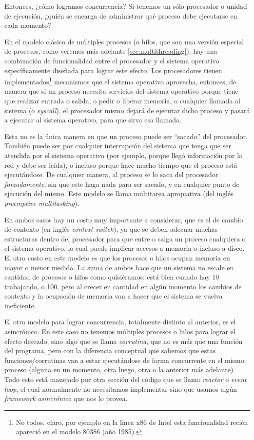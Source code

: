Entonces, ¿cómo logramos concurrencia? Si tenemos un sólo procesador o unidad de ejecución, ¿quién se encarga de administrar qué proceso debe ejecutarse en cada momento? 

En el modelo clásico de múltiples procesos (o hilos, que son una versión especial de procesos, como veremos más adelante \ref{sec:multithreading}), hay una combinación de funcionalidad entre el procesador y el sistema operativo específicamente diseñada para lograr este efecto. Los procesadores tienen implementados\footnote{No todos, claro, por ejemplo en la linea x86 de Intel esta funcionalidad recién apareció en el modelo 80386 (año 1985).} mecanismos que el sistema operativo aprovecha, entonces, de manera que si un proceso necesita servicios del sistema operativo porque tiene que realizar entrada o salida, o pedir o liberar memoria, o cualquier llamada al sistema (o \textit{syscall}), el procesador mismo dejará de ejecutar dicho proceso y pasará a ejecutar al sistema operativo, para que sirva esa llamada.

Esta no es la única manera en que un proceso puede ser ``sacado'' del procesador. También puede ser por cualquier interrupción del sistema que tenga que ser atendida por el sistema operativo (por ejemplo, porque llegó información por la red y debe ser leída), o incluso porque hace mucho tiempo que el proceso está ejecutándose. De cualquier manera, al proceso se lo saca del procesador \textit{forzadamente}, sin que este haga nada para ser sacado, y en cualquier punto de ejecución del mismo. Este modelo se llama multitarea apropiativa (del inglés \textit{preemptive multitasking}).

En ambos casos hay un costo muy importante a considerar, que es el de cambio de contexto (en inglés \textit{context switch}), ya que se deben adecuar muchas estructuras dentro del procesador para que entre o salga un proceso cualquiera o el sistema operativo, lo cual puede implicar accesos a memoria o incluso a disco. El otro costo en este modelo es que los procesos o hilos ocupan memoria en mayor o menor medida. La suma de ambos hace que un sistema no escale en cantidad de procesos o hilos como quisiéramos: está bien cuando hay 10 trabajando, o 100, pero al crecer en cantidad en algún momento los cambios de contexto y la ocupación de memoria van a hacer que el sistema se vuelva ineficiente.

El otro modelo para lograr concurrencia, totalmente distinto al anterior, es el asincrónico. En este caso no tenemos múltiples procesos o hilos para lograr el efecto deseado, sino algo que se llama \textit{corrutina}, que no es más que una función del programa, pero con la diferencia conceptual que sabemos que estas funciones/corrutinas van a estar ejecutándose de forma concurrente en el mismo proceso (alguna en un momento, otra luego, otra o la anterior más adelante). Todo esto está manejado por otra sección del código que se llama \textit{reactor} o \textit{event loop}, el cual normalmente no necesitamos implementar sino que usamos algún \textit{framework asincrónico} que nos lo provea.

